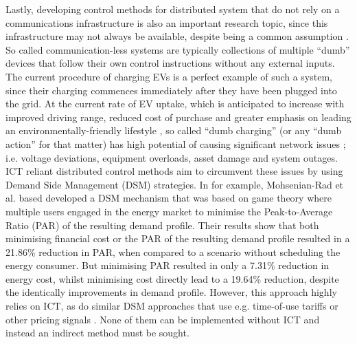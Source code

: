 Lastly, developing control methods for distributed system that do not rely on a communications infrastructure is also an important research topic, since this infrastructure may not always be available, despite being a common assumption \cite{Hatziargyriou2015}.
So called communication-less systems are typically collections of multiple ``dumb'' devices that follow their own control instructions without any external inputs.
The current procedure of charging EVs is a perfect example of such a system, since their charging commences immediately after they have been plugged into the grid.
At the current rate of EV uptake, which is anticipated to increase with improved driving range, reduced cost of purchase and greater emphasis on leading an environmentally-friendly lifestyle \cite{Shah2015}, so called ``dumb charging'' (or any ``dumb action'' for that matter) has high potential of causing significant network issues \cite{Hota2014, Liu2015a}; i.e. voltage deviations, equipment overloads, asset damage and system outages.
ICT reliant distributed control methods aim to circumvent these issues by using Demand Side Management (DSM) strategies.
In \cite{Mohsenian-Rad2010} for example, Mohsenian-Rad et al. based developed a DSM mechanism that was based on game theory where multiple users engaged in the energy market to minimise the Peak-to-Average Ratio (PAR) of the resulting demand profile.
Their results show that both minimising financial cost or the PAR of the resulting demand profile resulted in a 21.86\% reduction in PAR, when compared to a scenario without scheduling the energy consumer.
But minimising PAR resulted in only a 7.31\% reduction in energy cost, whilst minimising cost directly lead to a 19.64\% reduction, despite the identically improvements in demand profile.
However, this approach highly relies on ICT, as do similar DSM approaches that use e.g. time-of-use tariffs \cite{Deilami2011, Surles2012} or other pricing signals \cite{Masoum2015}.
None of them can be implemented without ICT and instead an indirect method must be sought.


